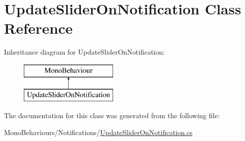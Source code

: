 \hypertarget{class_update_slider_on_notification}{}\section{Update\+Slider\+On\+Notification Class Reference}
\label{class_update_slider_on_notification}
Inheritance diagram for Update\+Slider\+On\+Notification\+:\begin{figure}[H]
\begin{center}
\leavevmode
\includegraphics[height=2.000000cm]{class_update_slider_on_notification}
\end{center}
\end{figure}


The documentation for this class was generated from the following file\+:\begin{DoxyCompactItemize}
\item 
Mono\+Behaviours/\+Notifications/\hyperlink{_update_slider_on_notification_8cs}{Update\+Slider\+On\+Notification.\+cs}\end{DoxyCompactItemize}
